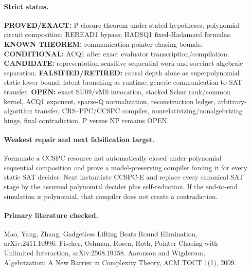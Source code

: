 \documentclass[11pt]{article}
\begin{document}
\paragraph{Strict status.} \textbf{PROVED/EXACT:} P-closure theorem under stated hypotheses; polynomial circuit composition; REREAD1 bypass; HADSQ1 fixed-Hadamard formulas. \textbf{KNOWN THEOREM:} communication pointer-chasing bounds. \textbf{CONDITIONAL:} ACQ1 after exact evaluator transcription/compilation. \textbf{CANDIDATE:} representation-sensitive sequential work and succinct algebraic separation. \textbf{FALSIFIED/RETIRED:} causal depth alone as superpolynomial static lower bound; latent branching as runtime; generic communication-to-SAT transfer. \textbf{OPEN:} exact SU09/vMS invocation, stacked Schur rank/common kernel, ACQ1 exponent, sparse-Q normalization, reconstruction ledger, arbitrary-algorithm transfer, CRS--PPC/CCSPC compiler, nonrelativizing/nonalgebrizing hinge, final contradiction. P versus NP remains OPEN.
\paragraph{Weakest repair and next falsification target.} Formulate a CCSPC resource not automatically closed under polynomial sequential composition and prove a model-preserving compiler forcing it for every static SAT decider. Next instantiate CCSPC-E and replace every canonical SAT stage by the assumed polynomial decider plus self-reduction. If the end-to-end simulation is polynomial, that compiler does not create a contradiction.
\paragraph{Primary literature checked.} Mao, Yang, Zhang, Gadgetless Lifting Beats Round Elimination, arXiv:2411.10996. Fischer, Oshman, Rosen, Roth, Pointer Chasing with Unlimited Interaction, arXiv:2508.19158. Aaronson and Wigderson, Algebrization: A New Barrier in Complexity Theory, ACM TOCT 1(1), 2009.
\end{document}
